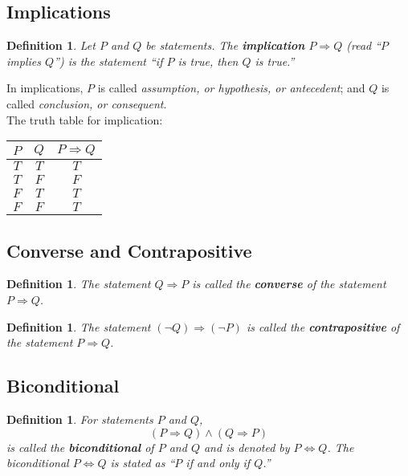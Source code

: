 \documentclass[10pt,reqno]{book}
\theoremstyle{plain}
\newtheorem{definition}[theorem]{Definition}
\begin{document}
	\subsection*{Implications}
	
	\begin{definition}
		Let $ P $ and $ Q $ be statements. The \textbf{implication} $ P \Rightarrow Q $ (read ``$ P $ implies $ Q $'') is the statement ``if $ P $ is true, then $ Q $ is true.'' 
	\end{definition}
	
	In implications, $ P $ is called \textit{assumption, or hypothesis, or antecedent}; and $ Q $ is called \textit{conclusion, or consequent}.\\
	
	The truth table for implication:
	\begin{center}
		\begin{tabular}{|c|c|c|}
			\hline
			$ P $ & $ Q $ & $ P \Rightarrow Q $ \\ \hline
			$ T $ & $ T $ &     $ T $      \\ \hline
			$ T $ & $ F $ &     $ F $      \\ \hline
			$ F $ & $ T $ &     $ T $      \\ \hline
			$ F $ & $ F $ &     $ T $      \\ \hline
		\end{tabular}
	\end{center}
	
	\subsection*{Converse and Contrapositive}
	
	\begin{definition}
		The statement $ Q \Rightarrow P $ is called the \textbf{converse} of the statement $ P \Rightarrow Q $.
	\end{definition}
	\begin{definition}
		The statement $ (\neg Q) \Rightarrow (\neg P) $ is called the \textbf{contrapositive} of the statement $ P \Rightarrow Q $.
	\end{definition}

	\subsection*{Biconditional}
	
	\begin{definition}
		For statements $ P $ and $ Q $, 
		\[ (P \Rightarrow Q) \wedge (Q \Rightarrow P) \]
		is called the \textbf{biconditional} of $ P $ and $ Q $ and is denoted by $ P \Leftrightarrow Q $. The biconditional $ P \Leftrightarrow Q $ is stated as ``$ P $ if and only if $ Q $.''
	\end{definition}
	
\end{document}
